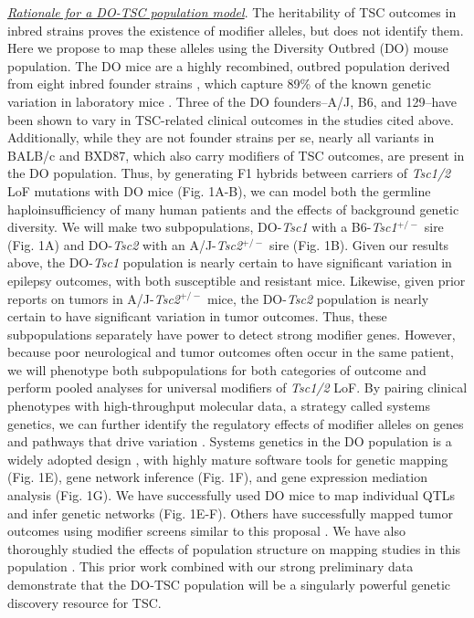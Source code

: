 \documentclass[
  12pt,
]{article}
\begin{document}
\textit{\underline{Rationale for a DO-TSC population model}}. The
heritability of TSC outcomes in inbred strains proves the existence of
modifier alleles, but does not identify them. Here we propose to map
these alleles using the Diversity Outbred (DO) mouse population. The DO
mice are a highly recombined, outbred population derived from eight
inbred founder strains \cite{22892839}, which capture 89\% of the known
genetic variation in laboratory mice \cite{17674098}. Three of the DO
founders--A/J, B6, and 129--have been shown to vary in TSC-related
clinical outcomes in the studies cited above. Additionally, while they
are not founder strains per se, nearly all variants in BALB/c and BXD87,
which also carry modifiers of TSC outcomes, are present in the DO
population. Thus, by generating F1 hybrids between carriers of
\textit{Tsc1/2} LoF mutations with DO mice (Fig. 1A-B), we can model
both the germline haploinsufficiency of many human patients and the
effects of background genetic diversity. We will make two
subpopulations, DO-\textit{Tsc1} with a B6-\textit{Tsc1}\(^{+/-}\) sire
(Fig. 1A) and DO-\textit{Tsc2} with an A/J-\textit{Tsc2}\(^{+/-}\) sire
(Fig. 1B). Given our results above, the DO-\textit{Tsc1} population is
nearly certain to have significant variation in epilepsy outcomes, with
both susceptible and resistant mice. Likewise, given prior reports on
tumors in A/J-\textit{Tsc2}\(^{+/-}\) mice, the DO-\textit{Tsc2}
population is nearly certain to have significant variation in tumor
outcomes. Thus, these subpopulations separately have power to detect
strong modifier genes. However, because poor neurological and tumor
outcomes often occur in the same patient, we will phenotype both
subpopulations for both categories of outcome and perform pooled
analyses for universal modifiers of \textit{Tsc1/2} LoF. By pairing
clinical phenotypes with high-throughput molecular data, a strategy
called systems genetics, we can further identify the regulatory effects
of modifier alleles on genes and pathways that drive variation
\cite{24296534}. Systems genetics in the DO population is a widely
adopted design
\cite{35277432, 33687326, 26614740, 27309819, 28916633, 30840070, 32467129, 32763908, 32795400, 32877673, 32917924, 33264334, 33619752, 34045313, 34324982, 34403447, 34653361, 34666007, 35383961, 35481286, 35616343, 35819478, 36028119, 36212994, 36649207, 36714272, 36788222, 36968078, 36993241, 37214876, 37082146, 37214980, 37276142, 37301941},
with highly mature software tools for genetic mapping \cite{30591514}
(Fig. 1E), gene network inference \cite{24204223} (Fig. 1F), and gene
expression mediation analysis \cite{35533209}(Fig. 1G). We have
successfully used DO mice to map individual QTLs and infer genetic
networks \cite{28592500, 37217254} (Fig. 1E-F). Others have successfully
mapped tumor outcomes using modifier screens similar to this proposal
\cite{27916600, 32796024}. We have also thoroughly studied the effects
of population structure on mapping studies in this population
\cite{33892506}. This prior work combined with our strong preliminary
data demonstrate that the DO-TSC population will be a singularly
powerful genetic discovery resource for TSC.
\end{document}
